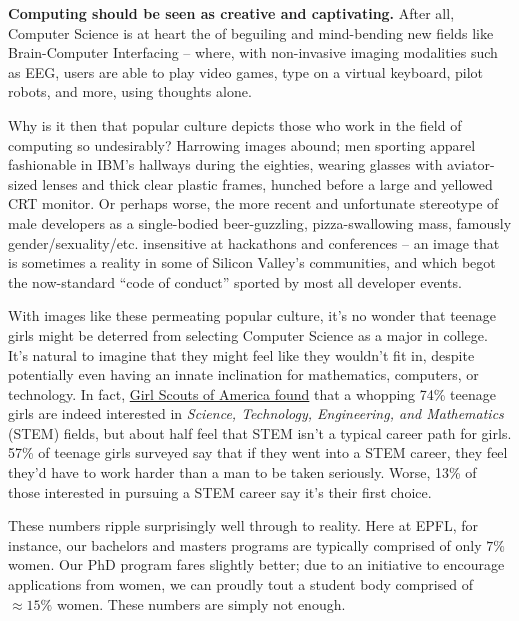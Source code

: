 \documentclass[acmtocl]{acmtrans2m}
\begin{document}
\textbf{Computing should be seen as creative and captivating.}
After all, Computer Science is at heart the of beguiling and mind-bending new
fields like {Brain-Computer} Interfacing -- where, with non-invasive imaging
modalities such as EEG, users are able to play video games, type on a virtual
keyboard, pilot robots, and more, using thoughts alone.

Why is it then that popular culture depicts those who work in the field of
computing so undesirably? Harrowing images abound; men sporting apparel
fashionable in IBM's hallways during the eighties, wearing glasses with
aviator-sized lenses and thick clear plastic frames, hunched before a large
and yellowed CRT monitor. Or perhaps worse, the more recent and unfortunate
stereotype of male developers as a {single-bodied} {beer-guzzling},
{pizza-swallowing} mass, famously gender/sexuality/etc. insensitive at
hackathons and conferences -- an image that is sometimes a reality in
some of Silicon Valley's communities, and which begot the {now-standard} ``code
of conduct'' sported by most all developer events.

With images like these permeating popular culture, it's no wonder that teenage
girls might be deterred from selecting Computer Science as a major in college.
It's natural to imagine that they might feel like they wouldn't fit in,
despite potentially even having an innate inclination for mathematics,
computers, or technology. In fact,
\href{https://www.girlscouts.org/research/pdf/generation\_stem\_full\_report.pdf}{Girl Scouts of America found}
\cite{Girlscouts} that a whopping 74\% teenage girls are indeed interested in {\em
Science, Technology, Engineering, and Mathematics} (STEM) fields, but about
half feel that STEM isn't a typical career path for girls. 57\% of teenage
girls surveyed say that if they went into a STEM career, they feel they'd have
to work harder than a man to be taken seriously. Worse, 13\% of those
interested in pursuing a STEM career say it's their first choice.

These numbers ripple surprisingly well through to reality. Here at EPFL, for
instance, our bachelors and masters programs are typically comprised of only
\href{http://www.swissict.ch/fileadmin/award/Impressionen/Symposium/WillyZwaenepoel\_ICT-Akademie.pdf}{$7\%$}~\cite{Willy}
women. Our PhD program fares slightly better; due to an initiative to
encourage applications from women, we can proudly tout a student body
comprised of $\approx15\%$ women. These numbers are simply not enough.
\end{document}

